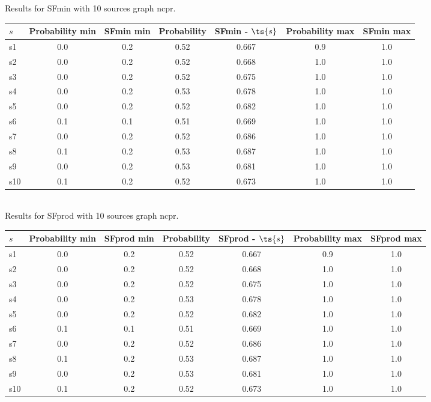 \documentclass{article}
\begin{document}
\noindent Results for SFmin with 10 sources graph ncpr.

\noindent\begin{tabular}{|l|c|c|c|c|c|c|}
\hline
$s$& Probability min & SFmin min & Probability & SFmin - $\ts{s}$ & Probability max & SFmin max\\
\hline
s1 &0.0 & 0.2 & 0.52 & 0.667 & 0.9 & 1.0\\
\hline
s2 &0.0 & 0.2 & 0.52 & 0.668 & 1.0 & 1.0\\
\hline
s3 &0.0 & 0.2 & 0.52 & 0.675 & 1.0 & 1.0\\
\hline
s4 &0.0 & 0.2 & 0.53 & 0.678 & 1.0 & 1.0\\
\hline
s5 &0.0 & 0.2 & 0.52 & 0.682 & 1.0 & 1.0\\
\hline
s6 &0.1 & 0.1 & 0.51 & 0.669 & 1.0 & 1.0\\
\hline
s7 &0.0 & 0.2 & 0.52 & 0.686 & 1.0 & 1.0\\
\hline
s8 &0.1 & 0.2 & 0.53 & 0.687 & 1.0 & 1.0\\
\hline
s9 &0.0 & 0.2 & 0.53 & 0.681 & 1.0 & 1.0\\
\hline
s10 &0.1 & 0.2 & 0.52 & 0.673 & 1.0 & 1.0\\
\hline
\end{tabular}\\

\noindent Results for SFprod with 10 sources graph ncpr.

\noindent\begin{tabular}{|l|c|c|c|c|c|c|}
\hline
$s$& Probability min & SFprod min & Probability & SFprod - $\ts{s}$ & Probability max & SFprod max\\
\hline
s1 &0.0 & 0.2 & 0.52 & 0.667 & 0.9 & 1.0\\
\hline
s2 &0.0 & 0.2 & 0.52 & 0.668 & 1.0 & 1.0\\
\hline
s3 &0.0 & 0.2 & 0.52 & 0.675 & 1.0 & 1.0\\
\hline
s4 &0.0 & 0.2 & 0.53 & 0.678 & 1.0 & 1.0\\
\hline
s5 &0.0 & 0.2 & 0.52 & 0.682 & 1.0 & 1.0\\
\hline
s6 &0.1 & 0.1 & 0.51 & 0.669 & 1.0 & 1.0\\
\hline
s7 &0.0 & 0.2 & 0.52 & 0.686 & 1.0 & 1.0\\
\hline
s8 &0.1 & 0.2 & 0.53 & 0.687 & 1.0 & 1.0\\
\hline
s9 &0.0 & 0.2 & 0.53 & 0.681 & 1.0 & 1.0\\
\hline
s10 &0.1 & 0.2 & 0.52 & 0.673 & 1.0 & 1.0\\
\hline
\end{tabular}\\
\end{document}
